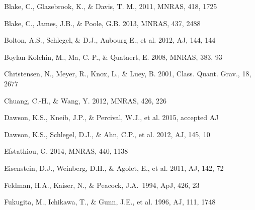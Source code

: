 \documentclass[iop]{emulateapj}
\begin{document}
\begin{thebibliography}{}
Blake, C., Glazebrook, K., \& Davis, T. M., 2011, MNRAS, 418, 1725  


Blake, C., James, J.B., \& Poole, G.B. 2013, MNRAS, 437, 2488

Bolton, A.S., Schlegel, \& D.J., Aubourg E., et al. 2012, AJ, 144, 144

Boylan-Kolchin, M., Ma, C.-P., \& Quataert, E. 2008, MNRAS, 383, 93






Christensen, N., Meyer, R., Knox, L., \& Luey, B. 2001, Class. Quant. Grav., 18, 2677


Chuang, C.-H., \& Wang, Y. 2012, MNRAS, 426, 226  



Dawson, K.S., Kneib, J.P., \& Percival, W.J., et al. 2015, accepted AJ

Dawson, K.S., Schlegel, D.J., \& Ahn, C.P., et al. 2012, AJ, 145, 10

Efstathiou, G. 2014, MNRAS, 440, 1138

Eisenstein, D.J.,  Weinberg, D.H., \& Agolet, E., et al. 2011, AJ, 142, 72

Feldman, H.A., Kaiser, N., \& Peacock, J.A.\ 1994, ApJ, 426, 23 

Fukugita, M., Ichikawa, T., \& Gunn, J.E., et al. 1996, AJ, 111, 1748


\end{thebibliography}
\end{document}
